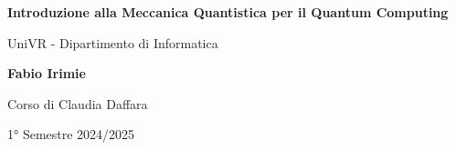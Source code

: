 \begin{titlepage}
	\begin{center}
		\vspace*{1cm}

		\Huge
		\textbf{Introduzione alla Meccanica Quantistica per il Quantum Computing}

		\vspace{0.5cm}
		\LARGE
		UniVR - Dipartimento di Informatica

		\vspace{1.5cm}

		\textbf{Fabio Irimie}

		\vfill


		\vspace{0.8cm}

    Corso di Claudia Daffara

		1° Semestre 2024/2025

	\end{center}
\end{titlepage}
